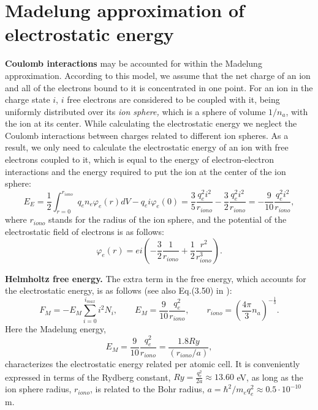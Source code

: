 \section{Madelung approximation of electrostatic energy}
{\bf Coulomb interactions} may be accounted for within the Madelung approximation.
According to this model, we assume that the net charge of an ion and all of the
electrons bound to it is concentrated in one point. For an ion in the charge state $i$,
$i$ free electrons are considered to be coupled with it, being uniformly distributed over its {\it ion sphere,} which is a sphere of volume $1/n_a$, with the ion at its center.
While calculating the electrostatic energy we neglect the Coulomb interactions between
charges related to different ion spheres. As a result, we only need to calculate the electrostatic energy
of an ion with free electrons coupled to it, which is equal to the energy of
electron-electron interactions and the energy required to put the ion
at the center of the ion sphere:
\begin{equation}
E_{E} = \frac12 \int_{r=0}^{r_{iono}}{q_e n_e \varphi_e(r) dV} - q_e i \varphi_e(0) =
\frac35 \frac{q_e^2 i^2}{r_{iono}} - \frac32 \frac{q_e^2 i^2}{r_{iono}} =
-\frac{9}{10} \frac{q_e^2 i^2}{r_{iono}},
\end{equation}
where $r_{iono}$ stands for the radius of the ion sphere, and the potential of
the electrostatic field of electrons is as follows:
\begin{equation}
\varphi_e(r) = ei \left( -\frac32 \frac{1}{r_{iono}} + \frac12 \frac{r^2}{r_{iono}^3} \right).
\end{equation}

{\bf Helmholtz free energy.}
The extra term in the free energy, which accounts for the
electrostatic energy, is as follows (see also Eq.(3.50) in \cite{drake}):
\begin{equation}\label{fterm}
F_M=-E_M \sum_{i=0}^{i_{max}} i^2 N_i,\qquad E_M=\frac{9}{10} \frac{q_e^2}{r_{iono}},\qquad
r_{iono} = \left( \frac{4 \pi}{3} n_a \right)^{-\frac13}.
\end{equation}
Here the Madelung energy,
\begin{equation}
E_M=\frac9{10}\frac{q_e^2}{r_{iono}}=\frac{1.8Ry}{(r_{iono}/a)},
\end{equation}
characterizes the electrostatic energy related per atomic cell. It is conveniently expressed in terms of the Rydberg constant,  $Ry=\frac{q_e^2}{2a}\approx 13.60$ eV, as long as
the ion sphere radius, $r_{iono}$, is related to the Bohr radius, $a=\hbar^2/m_e q_e^2\approx0.5\cdot10^{-10}$ m.


